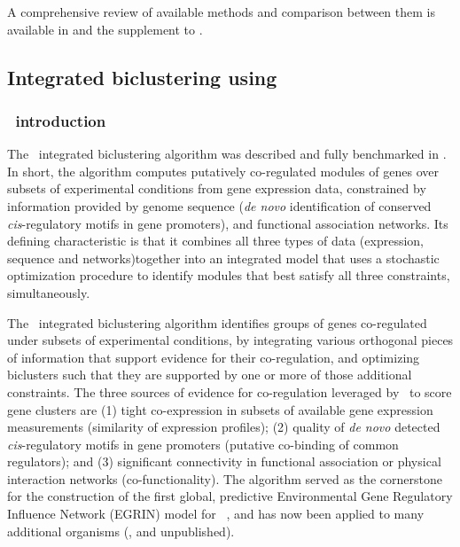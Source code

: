 \noindent A comprehensive review of available methods and comparison between them is available in \cite{de_smet_advantages_2010} and the supplement to \cite{marbach_wisdom_2012}.

\subsection{Integrated biclustering using \cm}

\label{chap:2:cmonkey}

\subsubsection{\cm\ introduction}

The \cm\ integrated biclustering algorithm was described and fully benchmarked in \cite{reiss_integrated_2006}. In short, the algorithm computes putatively co-regulated modules of genes over subsets of experimental conditions from gene expression data, constrained by information provided by genome sequence (\textit{de novo} identification of conserved \textit{cis}-regulatory motifs in gene promoters), and functional association networks. Its defining characteristic is that it combines all three types of data (expression, sequence and networks)together into an integrated model that uses a stochastic optimization procedure to identify modules that best satisfy all three constraints, simultaneously.

The \cm\ integrated biclustering algorithm identifies groups of genes co-regulated under subsets of experimental conditions, by integrating various orthogonal pieces of information that support evidence for their co-regulation, and optimizing biclusters such that they are supported by one or more of those additional constraints. The three sources of evidence for co-regulation leveraged by \cm\ to score gene clusters are (1) tight co-expression in subsets of available gene expression measurements (similarity of expression profiles); (2) quality of \textit{de novo} detected \textit{cis}-regulatory motifs in gene promoters (putative co-binding of common regulators); and (3) significant connectivity in functional association or physical interaction networks (co-functionality). The algorithm served as the cornerstone for the construction of the first global, predictive Environmental Gene Regulatory Influence Network (EGRIN) model for \halo\ \cite{bonneau_predictive_2007}, and has now been applied to many additional organisms (\eg, \cite{yoon_systems_2013} and unpublished).

